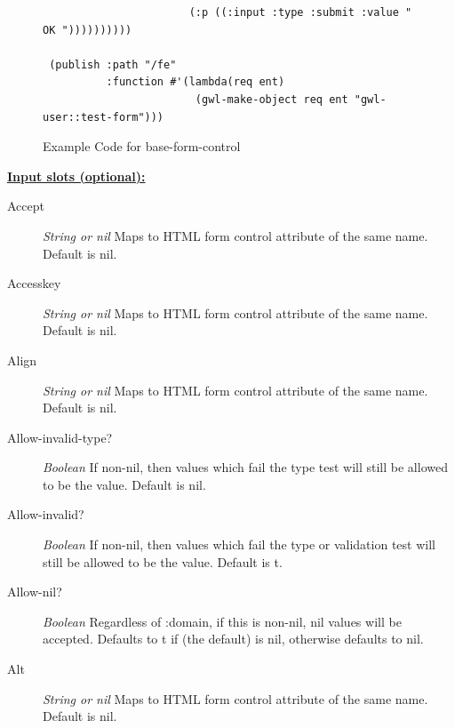 \documentclass [11pt]{book}
\begin{document}
\begin{itemize}
\begin{figure}
\begin{lrbox}{\boxedverb}
\begin{minipage}{\linewidth}
{\begin{verbatim}
                       (:p ((:input :type :submit :value " OK "))))))))))
 
 (publish :path "/fe"
          :function #'(lambda(req ent)
                        (gwl-make-object req ent "gwl-user::test-form")))

\end{verbatim}}
\end{minipage}
\end{lrbox}
\fbox{\usebox{\boxedverb}}

\caption{Example Code for base-form-control}

\label{fig:example-code-base-form-control}

\end{figure}





\textbf{
\underline{Input slots (optional):}}

\begin{description}

\item [Accept]
\emph{String or nil} Maps to HTML form control attribute of the same name. Default is nil.


\item [Accesskey]
\emph{String or nil} Maps to HTML form control attribute of the same name. Default is nil.


\item [Align]
\emph{String or nil} Maps to HTML form control attribute of the same name. Default is nil.


\item [Allow-invalid-type?]
\emph{Boolean} If non-nil, then values which fail the type test will still be allowed to be the value. Default is nil.


\item [Allow-invalid?]
\emph{Boolean} If non-nil, then values which fail the type or validation test will still be allowed to be the value. Default is t.


\item [Allow-nil?]
\emph{Boolean} Regardless of :domain, if this is non-nil, nil values will be accepted. Defaults to t if (the default) is nil,
otherwise defaults to nil.


\item [Alt]
\emph{String or nil} Maps to HTML form control attribute of the same name. Default is nil.



\end{description}
\end{itemize}
\end{document}
